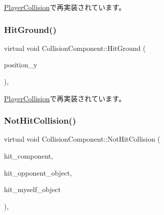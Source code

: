 \mbox{\hyperlink{class_player_collision_ae2d429a16bf2c3ee74070ef497a8696a}{Player\+Collision}}で再実装されています。

\mbox{\label{class_collision_component_a7538567006556bc03524df2655e83956}} 
\subsubsection{\texorpdfstring{Hit\+Ground()}{HitGround()}}
{\footnotesize\ttfamily virtual void Collision\+Component\+::\+Hit\+Ground (\begin{DoxyParamCaption}\item[{float}]{position\+\_\+y }\end{DoxyParamCaption})\hspace{0.3cm}{\ttfamily [inline]}, {\ttfamily [virtual]}}



\mbox{\hyperlink{class_player_collision_a3522ce17b1e1752f2737c2243582ecb0}{Player\+Collision}}で再実装されています。

\mbox{\label{class_collision_component_ad4d820d07872da11c9c1fd1b40157349}} 
\subsubsection{\texorpdfstring{Not\+Hit\+Collision()}{NotHitCollision()}}
{\footnotesize\ttfamily virtual void Collision\+Component\+::\+Not\+Hit\+Collision (\begin{DoxyParamCaption}\item[{\mbox{\hyperlink{class_collision_component}{Collision\+Component}} $\ast$}]{hit\+\_\+component,  }\item[{\mbox{\hyperlink{class_collision_object}{Collision\+Object}} $\ast$}]{hit\+\_\+opponent\+\_\+object,  }\item[{\mbox{\hyperlink{class_collision_object}{Collision\+Object}} $\ast$}]{hit\+\_\+myself\+\_\+object }\end{DoxyParamCaption})\hspace{0.3cm}{\ttfamily [inline]}, {\ttfamily [virtual]}}



